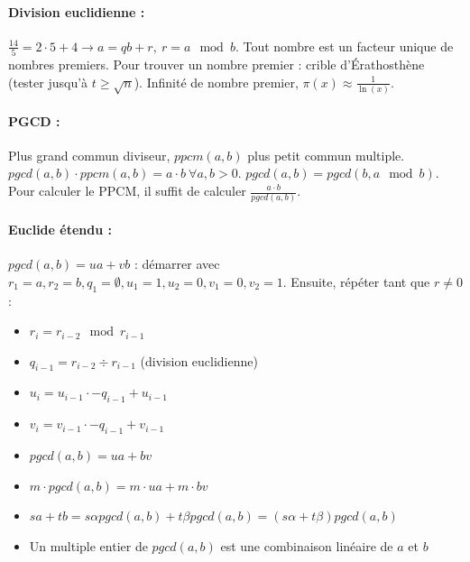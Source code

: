 \documentclass[11pt,a4paper]{report}
\begin{document}
\paragraph*{Division euclidienne :} $\frac{14}{5} = 2\cdot5+4 \rightarrow a=qb+r,\ r=a\mod b$. Tout nombre est un facteur unique de nombres premiers. Pour trouver un nombre premier : crible d'Érathosthène (tester jusqu'à $t\geq\sqrt{n}$). Infinité de nombre premier, $\pi(x)\approx\frac{1}{\ln(x)}$.

\paragraph*{PGCD :} Plus grand commun diviseur, $ppcm(a,b)$ plus petit commun multiple. $pgcd(a,b)\cdot ppcm(a,b) = a\cdot b\ \forall a,b > 0$. $pgcd(a,b) = pgcd(b,a\mod b)$. Pour calculer le PPCM, il suffit de calculer $\frac{a\cdot b}{pgcd(a,b)}$.

\paragraph*{Euclide étendu :} $pgcd(a,b)=ua+vb$ : démarrer avec $r_1=a,r_2=b,q_1=\emptyset,u_1=1,u_2=0,v_1=0,v_2=1$. Ensuite, répéter tant que $r\neq0$ :

\begin{minipage}{0.45\textwidth}
\begin{itemize}
    \item $r_i = r_{i-2} \mod r_{i-1}$
    \item $q_{i-1} = r_{i-2} \div r_{i-1}$ (division euclidienne)
    \item $u_i=u_{i-1}\cdot -q_{i-1} + u_{i-1}$
    \item $v_i=v_{i-1}\cdot -q_{i-1} + v_{i-1}$
\end{itemize}
\end{minipage}
\begin{minipage}{0.45\textwidth}
\begin{itemize}
    \item $pgcd(a,b)=ua+bv$
    \item $m\cdot pgcd(a,b)=m\cdot ua+m\cdot bv$
    \item $sa+tb=s\alpha pgcd(a,b)+t\beta pgcd(a,b) = (s\alpha+t\beta)pgcd(a,b)$
    \item Un multiple entier de $pgcd(a,b)$ est une combinaison linéaire de $a$ et $b$
\end{itemize}
\end{minipage}
\end{document}
